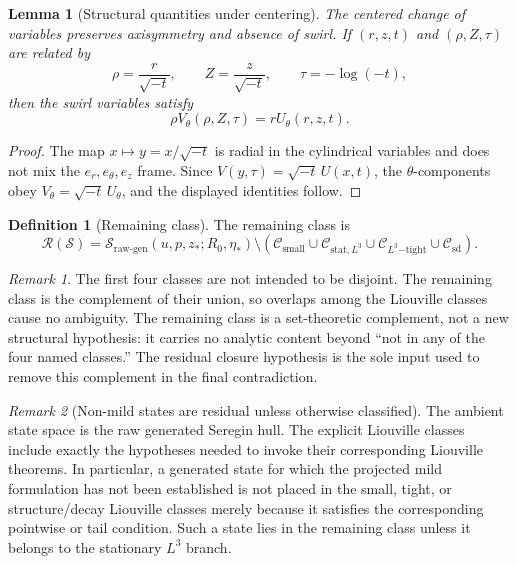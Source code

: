 \documentclass[11pt]{amsart}
\theoremstyle{plain}
\newtheorem{lemma}[lemma]{Lemma}
\theoremstyle{definition}
\newtheorem{definition}[definition]{Definition}
\theoremstyle{remark}
\newtheorem{remark}[remark]{Remark}
\numberwithin{equation}{section}
\newcommand{\calS}{\mathcal S}
\newcommand{\calR}{\mathcal R}
\newcommand{\calC}{\mathcal C}
\begin{document}
\begin{lemma}[Structural quantities under centering]
\label{p1:lem:structure-centering}
The centered change of variables preserves axisymmetry and absence of swirl.
If \((r,z,t)\) and \((\rho,Z,\tau)\) are related by
\[
   \rho=\frac r{\sqrt{-t}},\qquad Z=\frac z{\sqrt{-t}},
   \qquad \tau=-\log(-t),
\]
then the swirl variables satisfy
\[
   \rho V_\theta(\rho,Z,\tau)=rU_\theta(r,z,t).
\]
\end{lemma}

\begin{proof}
The map \(x\mapsto y=x/\sqrt{-t}\) is radial in the cylindrical variables and
does not mix the \(e_r,e_\theta,e_z\) frame.  Since
\(V(y,\tau)=\sqrt{-t}\,U(x,t)\), the \(\theta\)-components obey
\(V_\theta=\sqrt{-t}\,U_\theta\), and the displayed identities follow.
\end{proof}

\begin{definition}[Remaining class]\label{p1:def:remaining-class}
The remaining class is
\[
   \calR(\calS)
   =
   \calS_{\mathrm{raw\text{-}gen}}(u,p,z_*;R_0,\eta_*)
   \setminus
   \left(
      \calC_{\mathrm{small}}
      \cup
      \calC_{\mathrm{stat},L^3}
      \cup
      \calC_{L^3\mathrm{-tight}}
      \cup
      \calC_{\mathrm{sd}}
   \right).
\]
\end{definition}

\begin{remark}
The first four classes are not intended to be disjoint.  The remaining class is
the complement of their union, so overlaps among the Liouville classes cause no
ambiguity.  The remaining class is a set-theoretic complement, not a new
structural hypothesis: it carries no analytic content beyond ``not in any of
the four named classes.''  The residual closure hypothesis
 is the sole input used to remove this complement in
the final contradiction.
\end{remark}

\begin{remark}[Non-mild states are residual unless otherwise classified]
The ambient state space is the raw generated Seregin hull.  The explicit
Liouville classes include exactly the hypotheses needed to invoke their
corresponding Liouville theorems.  In particular, a generated state for which
the projected mild formulation has not been established is not placed in the
small, tight, or structure/decay Liouville classes merely because it satisfies
the corresponding pointwise or tail condition.  Such a state lies in the
remaining class unless it belongs to the stationary \(L^3\) branch.
\end{remark}
\end{document}

